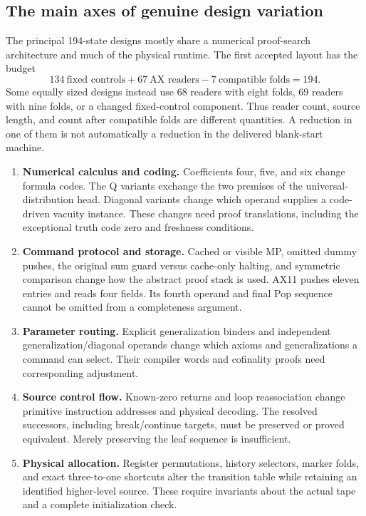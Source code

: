 \documentclass[11pt]{article}
\begin{document}
\subsection{The main axes of genuine design variation}
The principal 194-state designs mostly share a numerical proof-search
architecture and much of the physical runtime. The first accepted layout
has the budget
\[
 134\ \text{fixed controls}+67\ \text{AX readers}
       -7\ \text{compatible folds}=194.
\]
Some equally sized designs instead use 68 readers with eight folds,
69 readers with nine folds, or a changed fixed-control component. Thus
reader count, source length, and count after compatible folds are
different quantities. A reduction in one of them is not automatically
a reduction in the delivered blank-start machine.

\begin{enumerate}
\item \textbf{Numerical calculus and coding.} Coefficients four, five,
and six change formula codes. The Q variants exchange the two premises
of the universal-distribution head. Diagonal variants change which
operand supplies a code-driven vacuity instance. These changes need
proof translations, including the exceptional truth code zero and
freshness conditions.
\item \textbf{Command protocol and storage.} Cached or visible MP,
omitted dummy pushes, the original sum guard versus cache-only halting,
and symmetric comparison change how the abstract proof stack is used.
AX11 pushes eleven entries and reads four fields. Its fourth operand
and final Pop sequence cannot be omitted from a completeness argument.
\item \textbf{Parameter routing.} Explicit generalization binders and
independent generalization/diagonal operands change which axioms and
generalizations a command can select. Their compiler words and
cofinality proofs need corresponding adjustment.
\item \textbf{Source control flow.} Known-zero returns and loop
reassociation change primitive instruction addresses and physical
decoding. The resolved successors, including break/continue targets,
must be preserved or proved equivalent. Merely preserving the leaf
sequence is insufficient.
\item \textbf{Physical allocation.} Register permutations,
history selectors, marker folds, and exact three-to-one shortcuts alter
the transition table while retaining an identified higher-level source.
These require invariants about the actual tape and a complete
initialization check.
\end{enumerate}
\end{document}
